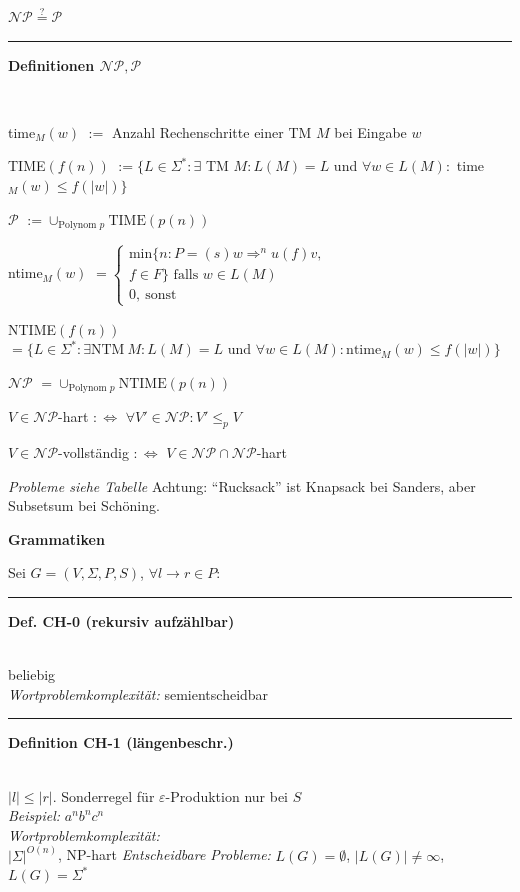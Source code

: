 \documentclass{article}
\newcommand{\h}[1]{\vspace{1ex}\begin{center}\small\textbf{#1}\end{center}}
\newcommand{\hh}[1]{{\vspace{1pt}\hrule\vspace{1pt} \noindent\textbf{#1}}\\}
\newcommand{\hhh}[1]{{\vspace{1pt}\noindent\emph{#1:}}}
\newenvironment{tightlist}{
\begin{list}{\textbullet}{
\setlength{\topsep}{-1ex}
\setlength{\itemsep}{-1ex}
\setlength{\leftmargin}{4ex}
}
}{
\end{list}
\vspace{1ex}
}
\begin{document}
\begin{multicols}{4}
\h{$\mathcal{NP} \stackrel{?}= \mathcal{P}$}
\hh{Definitionen $\mathcal{NP}, \mathcal{P}$ }
\begin{tightlist}
\item {time$_M(w)$} $:=$ Anzahl Rechenschritte einer TM $M$ bei Eingabe $w$\\
\item {TIME$(f(n))$} $:=\{L\in\Sigma^*:\exists$ TM $M:L(M) = L$ und $\forall w\in L(M):$ time$_M(w)\le f(|w|)\}$\\
\item {$\mathcal{P}$} $:=\cup_{\text{Polynom }p}\text{TIME}(p(n) )$\\
\item {ntime$_M(w)$} $=\begin{cases}\text{min}\{n:P=(s)w\Rightarrow^n u(f)v,\\ f\in F\} \text{ falls }w\in L(M)\\ 0,\ \text{sonst}\end{cases}$\\
\item {NTIME$(f(n))$} $=\{L\in\Sigma^*:\exists\text{NTM}\ M:L(M) = L\text{ und }\forall w\in L(M):\text{ntime}_M(w)\le f(|w|)\}$\\
\item {$\mathcal{NP}$} $=\cup_{\text{Polynom }p}\text{NTIME}(p(n))$\\
\item $V\in\mathcal{NP}$-hart $:\Leftrightarrow$ $\forall V'\in\mathcal{NP}: V'\le_pV$
\item $V\in\mathcal{NP}$-vollständig $:\Leftrightarrow$ $V\in \mathcal{NP}\cap\mathcal{NP}$-hart
\end{tightlist}

\emph{Probleme siehe Tabelle}
Achtung: "`Rucksack"' ist Knapsack bei Sanders, aber Subsetsum bei Schöning.

\h{Grammatiken}
Sei $G=(V, \Sigma, P, S)$, $\forall l\to r\in P:$\\
\hh{Def. CH-0 (rekursiv aufzählbar)}
beliebig\\
\hhh{Wortproblemkomplexität} semientscheidbar
\hh{Definition CH-1 (längenbeschr.)}
$|l|\le |r|$. Sonderregel für $\varepsilon$-Produktion nur bei $S$\\
\hhh{Beispiel} $a^nb^nc^n$\\
\hhh{Wortproblemkomplexität}\\ $|\Sigma|^{O(n)}$, NP-hart
\hhh{Entscheidbare Probleme}
$L(G) = \emptyset$, $|L(G)|\ne\infty$, $L(G)=\Sigma^*$


\end{multicols}
\end{document}
